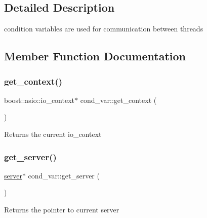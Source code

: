 \subsection{Detailed Description}
condition variables are used for communication between threads 

\subsection{Member Function Documentation}
\mbox{\label{classcond__var_aa517d0951844aaa609600903635b887d}} 
\subsubsection{\texorpdfstring{get\+\_\+context()}{get\_context()}}
{\footnotesize\ttfamily boost\+::asio\+::io\+\_\+context$\ast$ cond\+\_\+var\+::get\+\_\+context (\begin{DoxyParamCaption}{ }\end{DoxyParamCaption})\hspace{0.3cm}{\ttfamily [inline]}}

\begin{DoxyReturn}{Returns}
the current io\+\_\+context 
\end{DoxyReturn}
\mbox{\label{classcond__var_ae55f3716e292cca887be939fe8f10c26}} 
\subsubsection{\texorpdfstring{get\+\_\+server()}{get\_server()}}
{\footnotesize\ttfamily \hyperlink{classserver}{server}$\ast$ cond\+\_\+var\+::get\+\_\+server (\begin{DoxyParamCaption}{ }\end{DoxyParamCaption})\hspace{0.3cm}{\ttfamily [inline]}}

\begin{DoxyReturn}{Returns}
the pointer to current server 
\end{DoxyReturn}
\mbox{\label{classcond__var_a624ff85e7f2850661ec9c408ef1a7a26}} 
